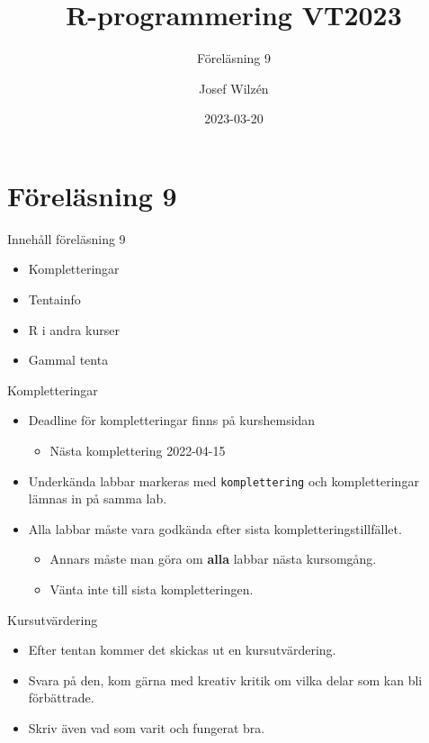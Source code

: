 \documentclass[
  11pt,
  ignorenonframetext,
  handout]{beamer}
\title{R-programmering VT2023}
\subtitle{Föreläsning 9}
\author{Josef Wilzén}
\date{2023-03-20}
\institute{Linköpings Universitet}
\providecommand{\tightlist}{%
  \setlength{\itemsep}{0pt}\setlength{\parskip}{0pt}}
\begin{document}
\frame{\titlepage}

\hypertarget{fuxf6reluxe4sning-9}{%
\section{Föreläsning 9}\label{fuxf6reluxe4sning-9}}

\begin{frame}{Innehåll föreläsning 9}
\protect\hypertarget{innehuxe5ll-fuxf6reluxe4sning-9}{}
\begin{itemize}
\tightlist
\item
  Kompletteringar
\item
  Tentainfo
\item
  R i andra kurser
\item
  Gammal tenta
\end{itemize}
\end{frame}

\begin{frame}[fragile]{Kompletteringar}
\protect\hypertarget{kompletteringar}{}
\begin{itemize}
\tightlist
\item
  Deadline för kompletteringar finns på kurshemsidan

  \begin{itemize}
  \tightlist
  \item
    Nästa komplettering 2022-04-15
  \end{itemize}
\item
  Underkända labbar markeras med \texttt{komplettering} och
  kompletteringar lämnas in på samma lab.
\item
  Alla labbar måste vara godkända efter sista kompletteringstillfället.

  \begin{itemize}
  \tightlist
  \item
    Annars måste man göra om \textbf{alla} labbar nästa kursomgång.
  \item
    Vänta inte till sista kompletteringen.
  \end{itemize}
\end{itemize}
\end{frame}

\begin{frame}{Kursutvärdering}
\protect\hypertarget{kursutvuxe4rdering}{}
\begin{itemize}
\tightlist
\item
  Efter tentan kommer det skickas ut en kursutvärdering.
\item
  Svara på den, kom gärna med kreativ kritik om vilka delar som kan bli
  förbättrade.
\item
  Skriv även vad som varit och fungerat bra.
\end{itemize}
\end{frame}
\end{document}
